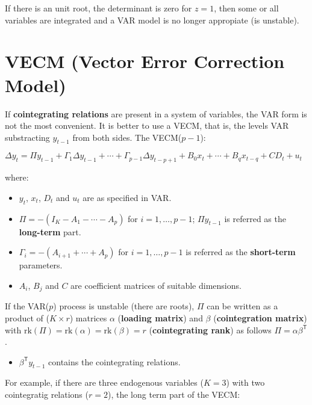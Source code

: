 \documentclass[10pt, a4paper, landscape]{article}
\newcommand{\tr}{\mathsf{T}}
\newcommand{\rk}{\mathrm{rk}}
\begin{document}
\begin{multicols}{2}
		If there is an unit root, the determinant is zero for $z = 1$, then some or all variables are integrated and a VAR model is no longer appropiate (is unstable).
		
		\columnbreak
		
		\section*{VECM (Vector Error Correction Model)}
		
		If \textbf{cointegrating relations} are present in a system of variables, the VAR form is not the most convenient. It is better to use a VECM, that is, the levels VAR substracting $y_{t - 1}$ from both sides. The VECM($p - 1$):
		
		\begin{center}
			$\Delta y_{t} = \Pi y_{t - 1} + \Gamma_{1} \Delta y_{t - 1} + \cdots + \Gamma_{p - 1} \Delta y_{t - p + 1} + B_{0} x_{t} + \cdots + B_{q} x_{t - q} + CD_{t} + u_{t}$
		\end{center}
		
		where:
		
		\begin{itemize}[leftmargin=*]
			\item $y_{t}$, $x_{t}$, $D_{t}$ and $u_{t}$ are as specified in VAR.
			\item $\Pi = - (I_{K} - A_{1} - \cdots - A_{p})$ for $i = 1, \ldots, p - 1$; $\Pi y_{t - 1}$ is referred as the \textbf{long-term} part.
			\item $\Gamma_{i} = - (A_{i + 1} + \cdots + A_{p})$ for $i = 1, \ldots, p - 1$ is referred as the \textbf{short-term} parameters.
			\item $A_{i}$, $B_{j}$ and $C$ are coefficient matrices of suitable dimensions.
		\end{itemize}
		
		If the VAR($p$) process is unstable (there are roots), $\Pi$ can be written as a product of ($K \times r$) matrices $\alpha$ (\textbf{loading matrix}) and $\beta$ (\textbf{cointegration matrix}) with $\rk(\Pi) = \rk(\alpha) = \rk(\beta) = r$ (\textbf{cointegrating rank}) as follows $\Pi = \alpha \beta^{\tr}$.
		
		\begin{itemize}[leftmargin=*]
			\item $\beta^{\tr} y_{t - 1}$ contains the cointegrating relations.
		\end{itemize}
		
		For example, if there are three endogenous variables ($K = 3$) with two cointegratig relations ($r = 2$), the long term part of the VECM:
		

\end{multicols}
\end{document}
